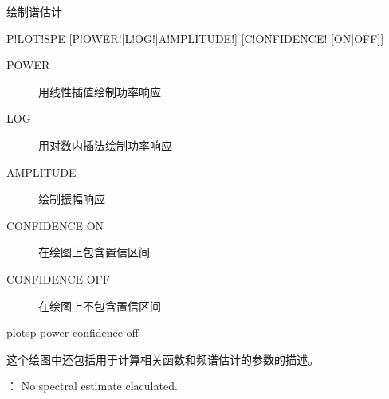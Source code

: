 \label{spe:plotspe}

绘制谱估计

\begin{SACSTX}
P!LOT!SPE [P!OWER!|L!OG!|A!MPLITUDE!] [C!ONFIDENCE! [ON|OFF]]
\end{SACSTX}

\begin{description}
\item [POWER] 用线性插值绘制功率响应
\item [LOG] 用对数内插法绘制功率响应
\item [AMPLITUDE] 绘制振幅响应
\item [CONFIDENCE ON] 在绘图上包含置信区间
\item [CONFIDENCE OFF] 在绘图上不包含置信区间
\end{description}

\begin{SACDFT}
plotsp power confidence off
\end{SACDFT}

这个绘图中还包括用于计算相关函数和频谱估计的参数的描述。

\begin{itemize}
： No spectral estimate claculated.
\end{itemize}
